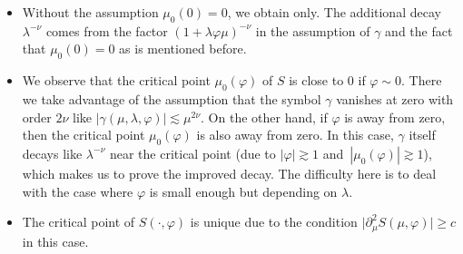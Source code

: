 \documentclass[10pt,a4paper]{article}
\numberwithin{equation}{section}
\def\c{\gamma}
\def\f{\varphi}
\def\l{\lambda}
\def\m{\mu}
\def\n{\nu}
\def\pa{\partial}
\begin{document}
\begin{Remark}\quad
\begin{itemize}\itemsep=0pt
\item[(1)] Without the assumption $\m_0(0)=0$, we obtain \smash{$I(\l,\f)\lesssim \l^{-\frac{1}{2}}$} only. The additional decay~$\l^{-\n}$ comes from the factor $(1+\l \f\m)^{-\n}$ in the assumption of $\c$ and the fact that $\m_0(0)=0$ as is mentioned before.

\item[(2)] We observe that the critical point $\m_0(\f)$ of $S$ is close to $0$ if $\f\sim 0$. There we take advantage of the assumption that the symbol $\c$ vanishes at zero with order $2\n$ like $|\c(\m,\l,\f)|\lesssim \m^{2\n}$. On the other hand, if $\f$ is away from zero, then the critical point $\m_0(\f)$ is also away from zero. In this case, $\c$ itself decays like $\l^{-\n}$ near the critical point (due to $|\f|\gtrsim 1$ and~${|\m_0(\f)|\gtrsim 1}$), which makes us to prove the improved decay. The difficulty here is to deal with the case where $\f$ is small enough but depending on $\l$.

\item[(3)]
The critical point of $S(\cdot,\f)$ is unique due to the condition $\big|\pa_{\m}^2S(\m,\f)\big|\geq c$ in this case.
\end{itemize}
\end{Remark}
\end{document}
